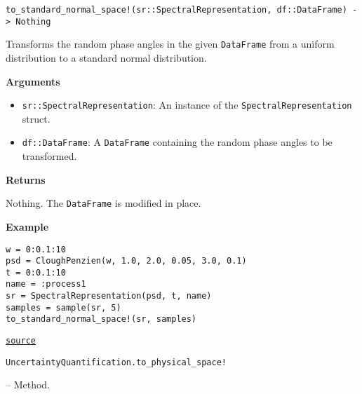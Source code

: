 \begin{adjustwidth}{2em}{0pt}


\begin{verbatim}
to_standard_normal_space!(sr::SpectralRepresentation, df::DataFrame) -> Nothing
\end{verbatim}

Transforms the random phase angles in the given \texttt{DataFrame} from a uniform distribution to a standard normal distribution.

\textbf{Arguments}

\begin{itemize}
\item \texttt{sr::SpectralRepresentation}: An instance of the \texttt{SpectralRepresentation} struct.


\item \texttt{df::DataFrame}: A \texttt{DataFrame} containing the random phase angles to be transformed.

\end{itemize}
\textbf{Returns}

Nothing. The \texttt{DataFrame} is modified in place.

\textbf{Example}


\begin{verbatim}
w = 0:0.1:10
psd = CloughPenzien(w, 1.0, 2.0, 0.05, 3.0, 0.1)
t = 0:0.1:10
name = :process1
sr = SpectralRepresentation(psd, t, name)
samples = sample(sr, 5)
to_standard_normal_space!(sr, samples)
\end{verbatim}



\href{https://github.com/friesischscott/UncertaintyQuantification.jl/blob/f5ee6cce729f0d6a57979257379c942cdf42f86f/src/inputs/stochasticprocesses/spectralrepresentation.jl#L131-L154}{\texttt{source}}


\end{adjustwidth}
\hypertarget{8606567393101569031}{\texttt{UncertaintyQuantification.to\_physical\_space!}}  -- {Method.}

